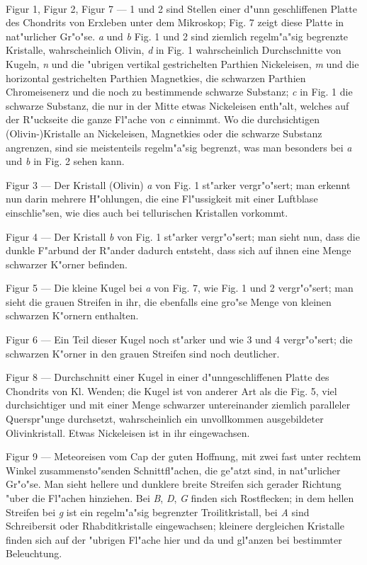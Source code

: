 \documentclass[a4paper, 11pt, oneside]{article}
\begin{document}
\paragraph{}
Figur 1, Figur 2, Figur 7 --- 1 und 2 sind Stellen einer d"unn geschliffenen Platte des Chondrits von Erxleben unter dem Mikroskop; Fig. 7 zeigt diese Platte in nat"urlicher Gr"o"se. \emph{a} und \emph{b} Fig. 1 und 2 sind ziemlich regelm"a"sig begrenzte Kristalle, wahrscheinlich Olivin, \emph{d} in Fig. 1 wahrscheinlich Durchschnitte von Kugeln, \emph{n} und die "ubrigen vertikal gestrichelten Parthien Nickeleisen, \emph{m} und die horizontal gestrichelten Parthien Magnetkies, die schwarzen Parthien Chromeisenerz und die noch zu bestimmende schwarze Substanz; \emph{c} in Fig. 1 die schwarze Substanz, die nur in der Mitte etwas Nickeleisen enth"alt, welches auf der R"uckseite die ganze Fl"ache von \emph{c} einnimmt. Wo die durchsichtigen (Olivin-)Kristalle an Nickeleisen, Magnetkies oder die schwarze Substanz angrenzen, sind sie meistenteils regelm"a"sig begrenzt, was man besonders bei \emph{a} und \emph{b} in Fig. 2 sehen kann.

Figur 3 --- Der Kristall (Olivin) \emph{a} von Fig. 1 st"arker vergr"o"sert; man erkennt nun darin mehrere H"ohlungen, die eine Fl"ussigkeit mit einer Luftblase einschlie"sen, wie dies auch bei tellurischen Kristallen vorkommt.

Figur 4 --- Der Kristall \emph{b} von Fig. 1 st"arker vergr"o"sert; man sieht nun, dass die dunkle F"arbund der R"ander dadurch entsteht, dass sich auf ihnen eine Menge schwarzer K"orner befinden.

Figur 5 --- Die kleine Kugel bei \emph{a} von Fig. 7, wie Fig. 1 und 2 vergr"o"sert; man sieht die grauen Streifen in ihr, die ebenfalls eine gro"se Menge von kleinen schwarzen K"ornern enthalten.

Figur 6 --- Ein Teil dieser Kugel noch st"arker und wie 3 und 4 vergr"o"sert; die schwarzen K"orner in den grauen Streifen sind noch deutlicher.

Figur 8 --- Durchschnitt einer Kugel in einer d"unngeschliffenen Platte des Chondrits von Kl. Wenden; die Kugel ist von anderer Art als die Fig. 5, viel durchsichtiger und mit einer Menge schwarzer untereinander ziemlich paralleler Querspr"unge durchsetzt, wahrscheinlich ein unvollkommen ausgebildeter Olivinkristall. Etwas Nickeleisen ist in ihr eingewachsen.

Figur 9 --- Meteoreisen vom Cap der guten Hoffnung, mit zwei fast unter rechtem Winkel zusammensto"senden Schnittfl"achen, die ge"atzt sind, in nat"urlicher Gr"o"se. Man sieht hellere und dunklere breite Streifen sich gerader Richtung "uber die Fl"achen hinziehen. Bei \emph{B}, \emph{D}, \emph{G} finden sich Rostflecken; in dem hellen Streifen bei \emph{g} ist ein regelm"a"sig begrenzter Troilitkristall, bei \emph{A} sind Schreibersit oder Rhabditkristalle eingewachsen; kleinere dergleichen Kristalle finden sich auf der "ubrigen Fl"ache hier und da und gl"anzen bei bestimmter Beleuchtung.
\end{document}
